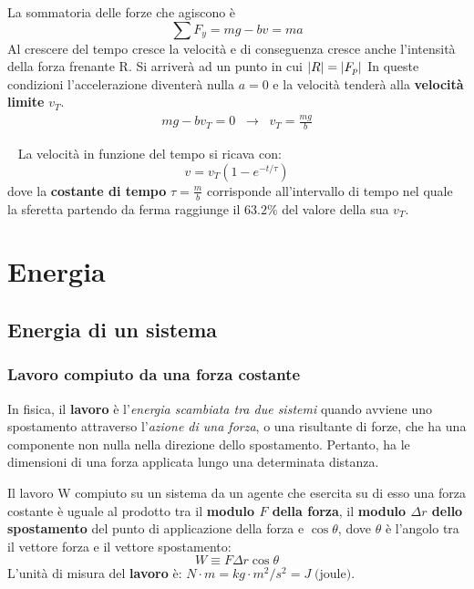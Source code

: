 \documentclass[a4paper,11pt,oneside]{book}
\begin{document}
\noindent La sommatoria delle forze che agiscono è 
\begin{equation*}
    \sum F_y = mg - bv = ma
\end{equation*}
Al crescere del tempo cresce la velocità e di conseguenza cresce anche l'intensità della forza frenante R. Si arriverà ad un punto in cui $\abs{R} = \abs{F_p}$
In queste condizioni l'accelerazione diventerà nulla $a=0$ e la velocità tenderà alla \textbf{velocità limite} $v_T$.
\begin{align*}
    mg - bv_T = 0 \;\; \rightarrow \;\; v_T = \frac{mg}{b}
\end{align*}

~\newline
La velocità in funzione del tempo si ricava con:
\begin{equation*}
    v = v_T(1-e^{-t/\tau})
\end{equation*}
dove la \textbf{costante di tempo} $\tau = \tfrac{m}{b}$ corrisponde all’intervallo di tempo nel quale la sferetta partendo da ferma raggiunge il $63.2\%$ del valore della sua $v_T$.

\chapter{Energia}

\section{Energia di un sistema}
\subsection{Lavoro compiuto da una forza costante}
In fisica, il \textbf{lavoro} è l'\emph{energia scambiata tra due sistemi} quando avviene uno spostamento attraverso l'\emph{azione di una forza}, o una risultante di forze, che ha una componente non nulla nella direzione dello spostamento. 
Pertanto, ha le dimensioni di una forza applicata lungo una determinata distanza. 

Il lavoro W compiuto su un sistema da un agente che esercita su di esso una forza costante è uguale al prodotto tra il \textbf{modulo $F$ della forza}, 
il \textbf{modulo $\Delta r$ dello spostamento} del punto di applicazione della forza e {\boldmath$\cos{\theta}$}, dove $\theta$ è l’angolo tra il vettore forza e il vettore spostamento:
\begin{equation*}
    W \equiv F \Delta r \cos{\theta}
\end{equation*}
L'unità di misura del \textbf{lavoro} è: $N \cdot m = kg \cdot m^2/s^2 = J \; \text{(joule)}$.
\end{document}
